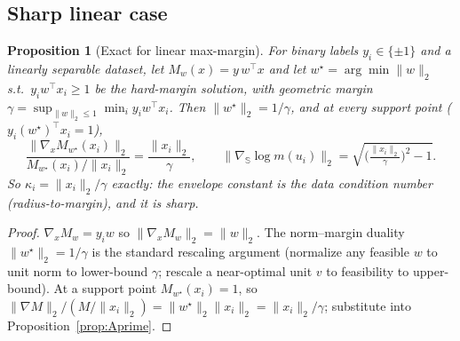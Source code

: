 \documentclass[11pt]{article}
\newtheorem{proposition}{Proposition}
\theoremstyle{definition}
\newcommand{\Sph}{\mathbb{S}}
\newcommand{\grad}{\nabla}
\begin{document}
\subsection{Sharp linear case}\label{sec:linear}
\begin{proposition}[Exact for linear max-margin]\label{prop:linear}
For binary labels $y_i\in\{\pm1\}$ and a linearly separable dataset, let
$M_w(x)=y\,w^\top x$ and let $w^\star=\arg\min\|w\|_2$ s.t.\ $y_iw^\top x_i\ge1$ be
the hard-margin solution, with geometric margin
$\gamma=\sup_{\|w\|_2\le1}\min_i y_iw^\top x_i$. Then $\|w^\star\|_2=1/\gamma$, and at
every support point ($y_i(w^\star)^\top x_i=1$),
\[
  \frac{\|\grad_x M_{w^\star}(x_i)\|_2}{M_{w^\star}(x_i)/\|x_i\|_2}
  =\frac{\|x_i\|_2}{\gamma},\qquad
  \|\grad_{\Sph}\log m(u_i)\|_2=\sqrt{\Big(\tfrac{\|x_i\|_2}{\gamma}\Big)^2-1}.
\]
So $\kappa_i=\|x_i\|_2/\gamma$ exactly: the envelope constant is the data
condition number (radius-to-margin), and it is sharp.
\end{proposition}
\begin{proof}
$\grad_x M_w=y_iw$ so $\|\grad_xM_w\|_2=\|w\|_2$. The norm--margin duality
$\|w^\star\|_2=1/\gamma$ is the standard rescaling argument (normalize any feasible
$w$ to unit norm to lower-bound $\gamma$; rescale a near-optimal unit $v$ to feasibility
to upper-bound). At a support point $M_{w^\star}(x_i)=1$, so
$\|\grad M\|_2/(M/\|x_i\|_2)=\|w^\star\|_2\|x_i\|_2=\|x_i\|_2/\gamma$; substitute into
Proposition~\ref{prop:Aprime}.
\end{proof}
\end{document}
